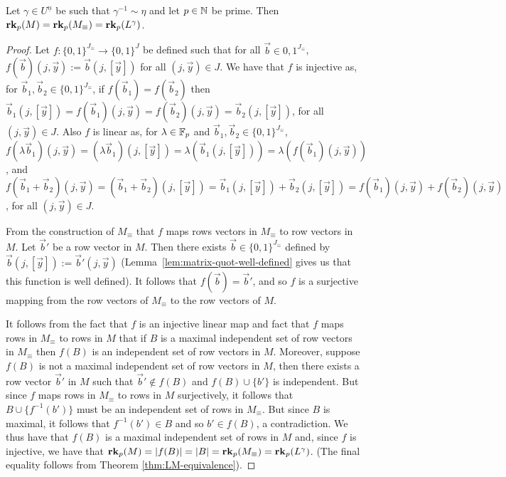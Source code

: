 \documentclass[../paper.tex]{subfiles}
\begin{document}
\begin{lem}
	Let $\gamma \in U^{\underline{n}}$ be such that $\gamma^{-1} \sim \eta$ and
	let $p \in \mathbb{N}$ be prime. Then $\text{\textbf{rk}}_p (M) = \text{\textbf{rk}}_p (M_\equiv) = \text{\textbf{rk}}_p
	(L^{\gamma})$.
\end{lem}
\begin{proof}
	Let $f : \{0,1\}^{J_\equiv} \rightarrow \{0,1\}^{J}$ be defined such that for
	all $\vec{b} \in {0,1}^{J_\equiv}$, $f(\vec{b}) (j, \vec{y}) := \vec{b}(j,
	[\vec{y}])$ for all $(j, \vec{y}) \in J$. We have that $f$ is injective as,
	for $\vec{b}_1, \vec{b}_2 \in \{0,1\}^{J_\equiv}$, if $f(\vec{b}_1) =
	f(\vec{b}_2)$ then $\vec{b}_1 (j, [\vec{y}]) = f(\vec{b}_1)(j, \vec{y}) =
	f(\vec{b}_2)(j, \vec{y}) = \vec{b}_2(j, [\vec{y}])$, for all $(j, \vec{y}) \in
	J$. Also $f$ is linear as, for $\lambda \in \mathbb{F}_p$ and $\vec{b}_1, \vec{b}_2
	\in \{0,1\}^{J_\equiv}$, $f(\lambda \vec{b}_1) (j, \vec{y}) = (\lambda
	\vec{b}_1)(j, [\vec{y}]) = \lambda (\vec{b}_1 (j, [\vec{y}])) = \lambda (f(
	\vec{b}_1) (j, \vec{y}))$, and $ f(\vec{b}_1 + \vec{b}_2) (j, \vec{y}) =
	(\vec{b}_1 + \vec{b}_2) (j, [\vec{y}]) = \vec{b}_1(j, [\vec{y}]) +
	\vec{b}_2(j, [\vec{y}]) = f(\vec{b}_1)(j, \vec{y}) + f(\vec{b}_2)(j,
	\vec{y})$, for all $(j, \vec{y}) \in J$.
		
	From the construction of $M_\equiv$ that $f$ maps rows vectors in $M_\equiv$
	to row vectors in $M$. Let $\vec{b}'$ be a row vector in $M$. Then there
	exists $\vec{b} \in \{0,1\}^{J_\equiv}$ defined by $\vec{b} (j, [\vec{y}]) :=
	\vec{b}' (j, \vec{y})$ (Lemma~\ref{lem:matrix-quot-well-defined} gives us that
	this function is well defined). It follows that $f(\vec{b}) = \vec{b}'$, and
	so $f$ is a surjective mapping from the row vectors of $M_\equiv$ to the row
	vectors of $M$.
		
	It follows from the fact that $f$ is an injective linear map and fact that $f$
	maps rows in $M_\equiv$ to rows in $M$ that if $B$ is a maximal independent
	set of row vectors in $M_\equiv$ then $f(B)$ is an independent set of row
	vectors in $M$. Moreover, suppose $f(B)$ is not a maximal independent set of
	row vectors in $M$, then there exists a row vector $\vec{b}'$ in $M$ such that
	$\vec{b}' \notin f(B)$ and $f(B) \cup \{b'\}$ is independent. But since $f$
	maps rows in $M_\equiv$ to rows in $M$ surjectively, it follows that $B \cup
	\{f^{-1}(b') \}$ must be an independent set of rows in $M_\equiv$. But since
	$B$ is maximal, it follows that $f^{-1}(b') \in B$ and so $b' \in f(B)$, a
	contradiction. We thus have that $f(B)$ is a maximal independent set of rows
	in $M$ and, since $f$ is injective, we have that $\text{\textbf{rk}}_p (M) = \vert f(B) \vert 	= \vert B \vert = \text{\textbf{rk}}_p (M_\equiv) = \text{\textbf{rk}}_p(L^{\gamma})$. (The final equality
	follows from Theorem \ref{thm:LM-equivalence}).
\end{proof}
\end{document}
